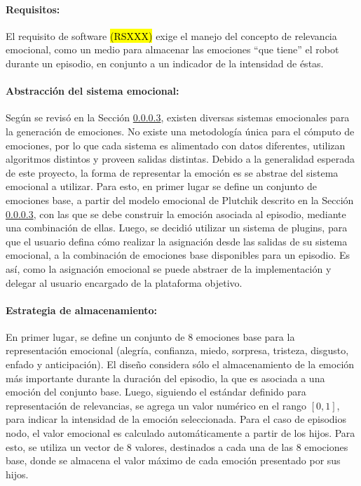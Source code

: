 \paragraph{Requisitos:}
El requisito de software \hl{(RSXXX)} exige el manejo del concepto de relevancia emocional, como un medio para almacenar las emociones ``que tiene'' el robot durante un episodio, en conjunto a un indicador de la intensidad de éstas.


\paragraph{Abstracción del sistema emocional:}
Según se revisó en la Sección \ref{}, existen diversas sistemas emocionales para la generación de emociones. No existe una metodología única para el cómputo de emociones, por lo que cada sistema es alimentado con datos diferentes, utilizan algoritmos distintos y proveen salidas distintas. Debido a la generalidad esperada de este proyecto, la forma de representar la emoción es se abstrae del sistema emocional a utilizar. Para esto, en primer lugar se define un conjunto de emociones base, a partir del modelo emocional de Plutchik descrito en la Sección \ref{}, con las que se debe construir la emoción asociada al episodio, mediante una combinación de ellas. Luego, se decidió utilizar un sistema de plugins, para que el usuario defina cómo realizar la asignación desde las salidas de su sistema emocional, a la combinación de emociones base disponibles para un episodio. Es así, como la asignación emocional se puede  abstraer de la implementación y delegar al usuario encargado de la plataforma objetivo.


\paragraph{Estrategia de almacenamiento:}
En primer lugar, se define un conjunto de 8 emociones base para la representación emocional (alegría, confianza, miedo, sorpresa, tristeza, disgusto, enfado y anticipación). El diseño considera sólo el almacenamiento de la emoción más importante durante la duración del episodio, la que es asociada a una emoción del conjunto base. Luego, siguiendo el estándar definido para representación de relevancias, se agrega un valor numérico en el rango $[0, 1]$, para  indicar la intensidad de la emoción seleccionada. Para el caso de episodios nodo, el valor emocional es calculado automáticamente a partir de los hijos. Para esto, se utiliza un vector de 8 valores, destinados a cada una de las 8 emociones base, donde se almacena el valor máximo de cada emoción presentado por sus hijos.


